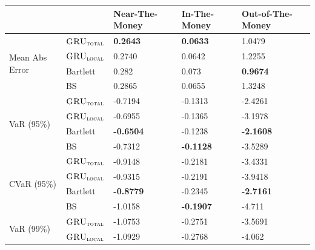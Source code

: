 \documentclass[letterpaper,12pt,titlepage,oneside,final]{book}
\numberwithin{equation}{section}
\theoremstyle{definition}
\newcommand{\modelT}{\textsc{GRU}_{\textsc{total}}}
\newcommand{\modelL}{\textsc{GRU}_{\textsc{local}}}
\begin{document}
\begin{table}[htp!]
	\centering
	\begin{tabular}{ll|l|l|l|}
		\cline{3-5}
		&          & Near-The-Money   & In-The-Money     & Out-of-The-Money \\ \hline
		\multicolumn{1}{|l|}{\multirow{4}{*}{Mean Abs Error}} & $\modelT$    & \textbf{0.2643}  & \textbf{0.0633}  & 1.0479           \\  
		\multicolumn{1}{|l|}{}                                & $\modelL$    & 0.2740           & 0.0642           & 1.2255           \\  
		\multicolumn{1}{|l|}{}                                & Bartlett 	 & 0.282            & 0.073            & \textbf{0.9674}  \\  
		\multicolumn{1}{|l|}{}                                & BS       	 & 0.2865           & 0.0655           & 1.3248           \\ 
		\hline
		\multicolumn{1}{|l|}{\multirow{4}{*}{VaR (95\%)}}     & $\modelT$    & -0.7194  		& -0.1313 		   			&-2.4261       \\  
		\multicolumn{1}{|l|}{}                                & $\modelL$    & -0.6955			& -0.1365 		   			&-3.1978 \\  
		\multicolumn{1}{|l|}{}                                & Bartlett 	 &\textbf{-0.6504} 	&-0.1238 		   			&\textbf{-2.1608}          \\  
		\multicolumn{1}{|l|}{}                                & BS       	 & -0.7312 			&\textbf{-0.1128} 		   & -3.5289        \\ 
		\hline 
		\multicolumn{1}{|l|}{\multirow{4}{*}{CVaR (95\%)}}    & $\modelT$    &-0.9148 			&-0.2181 		   		  &-3.4331 \\  
		\multicolumn{1}{|l|}{}                                & $\modelL$    &-0.9315 			&-0.2191 		   		   &-3.9418         \\  
		\multicolumn{1}{|l|}{}                                & Bartlett 	 &\textbf{-0.8779}  &-0.2345           		   &\textbf{-2.7161}          \\  
		\multicolumn{1}{|l|}{}                                & BS       	 &-1.0158 			&\textbf{-0.1907} 		   &-4.711          \\ 
		\hline
		\multicolumn{1}{|l|}{\multirow{4}{*}{VaR (99\%)}}     & $\modelT$    & -1.0753 			& -0.2751 		   			&-3.5691       \\  
		\multicolumn{1}{|l|}{}                                & $\modelL$    &-1.0929 			&-0.2768 		   			&-4.062         \\  

\end{tabular}
\end{table}
\end{document}
